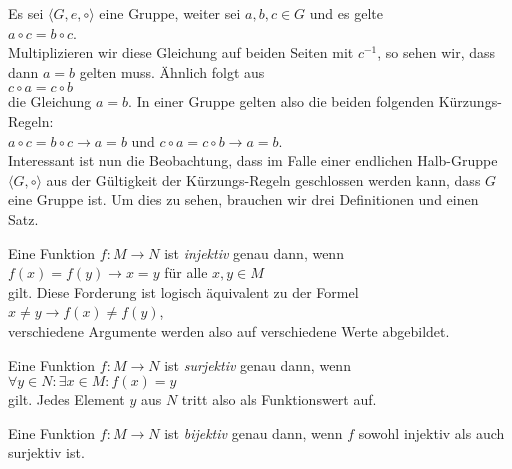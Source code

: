 \remark Es sei $\langle G, e, \circ \rangle$ eine Gruppe, weiter sei $a,b,c \in G$ und es gelte
\\[0.2cm]
\hspace*{1.3cm} $a \circ c = b \circ c$.
\\[0.2cm]
Multiplizieren wir diese Gleichung auf beiden Seiten mit $c^{-1}$, so sehen wir, dass dann $a = b$ gelten
muss.  Ähnlich folgt aus
\\[0.2cm]
\hspace*{1.3cm} $c \circ a = c \circ b$
\\[0.2cm]
die Gleichung $a = b$.  In einer Gruppe gelten also die beiden folgenden Kürzungs-Regeln:
\\[0.2cm]
\hspace*{1.3cm} 
$a \circ c = b \circ c \rightarrow a = b$ \quad und \quad
$c \circ a = c \circ b \rightarrow a = b$.
\\[0.2cm]
Interessant ist nun die Beobachtung, dass im Falle einer endlichen Halb-Gruppe 
$\langle G, \circ \rangle$ aus der Gültigkeit der  
Kürzungs-Regeln geschlossen werden kann, dass $G$ eine Gruppe ist.
Um dies zu sehen, brauchen wir drei Definitionen und einen Satz.
\eox

\begin{Definition}[injektiv]
  Eine Funktion $f: M \rightarrow N$ ist \emph{injektiv} genau dann, wenn
  \\[0.2cm]
  \hspace*{1.3cm}
  $f(x) = f(y) \rightarrow x = y$ \quad für alle $x,y\in M$ 
  \\[0.2cm]
  gilt.  Diese Forderung ist logisch äquivalent zu der Formel
  \\[0.2cm]
  \hspace*{1.3cm}
  $x \not= y \rightarrow f(x) \not= f(y)$,
  \\[0.2cm]
  verschiedene Argumente werden also auf verschiedene Werte abgebildet.
\eox
\end{Definition}

\begin{Definition}[surjektiv]
  Eine Funktion $f: M \rightarrow N$ ist \emph{surjektiv} genau dann, wenn
  \\[0.2cm]
  \hspace*{1.3cm}
  $\forall y \in N: \exists x \in M: f(x) = y$ 
  \\[0.2cm]
  gilt.  Jedes Element $y$ aus $N$ tritt also als Funktionswert auf.
\eox
\end{Definition}

\begin{Definition}[bijektiv] \lb
  Eine Funktion $f: M \rightarrow N$ ist \emph{bijektiv} genau dann, wenn
 $f$ sowohl injektiv als auch surjektiv ist.  
\eox
\end{Definition}

